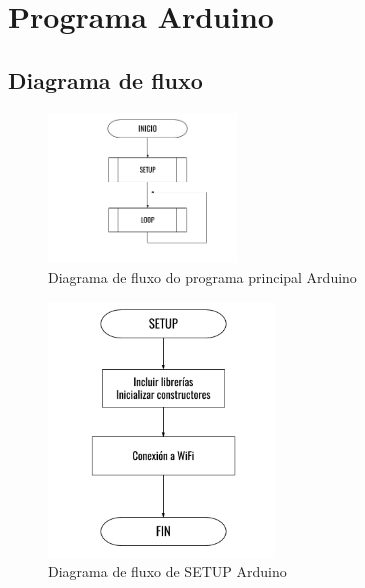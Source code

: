 \documentclass[11pt,twoside]{book}
\begin{document}
\section{Programa Arduino}

\subsection{Diagrama de fluxo}

\begin{figure}[H]
	\begin{center}
		\includegraphics[width=5cm]{images/diagrama_flujo_inicio.png}
	\end{center}
	\caption{Diagrama de fluxo do programa principal Arduino}
	\label{fig:FluxoPrincipal}
\end{figure}

\begin{figure}[H]
	\begin{center}
		\includegraphics[width=6cm]{images/diagrama_flujo_setup.png}
	\end{center}
	\caption{Diagrama de fluxo de SETUP Arduino}
	\label{fig:FluxoSETUP}
\end{figure}
\end{document}

